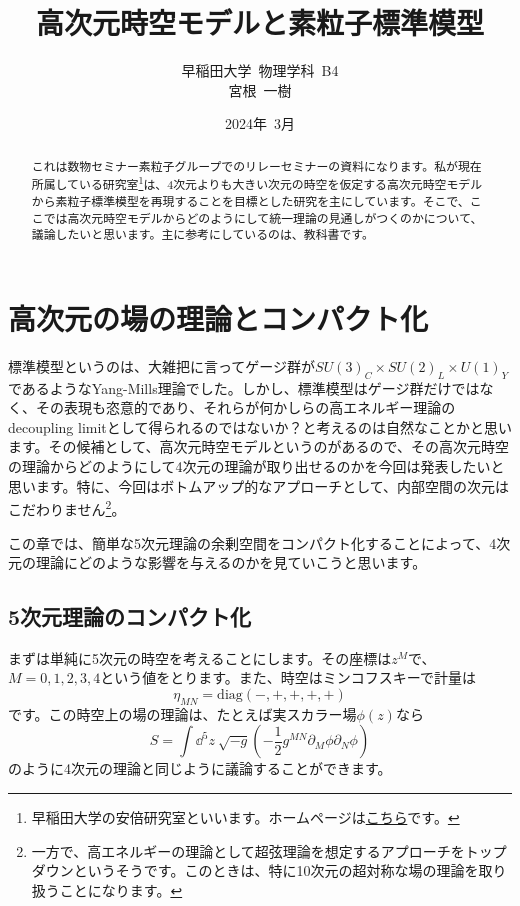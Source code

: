 \documentclass[unicode,a4paper,11pt]{ltjsarticle}
\title{高次元時空モデルと素粒子標準模型}
\author{
   早稲田大学\ 物理学科\ B4
   \\
   宮根\ 一樹
}
\date{2024年\ 3月}
\begin{document}
\maketitle

\begin{abstract}
   これは数物セミナー素粒子グループでのリレーセミナーの資料になります。私が現在所属している研究室\footnote{
      早稲田大学の安倍研究室といいます。ホームページは\href{http://www.hep.phys.waseda.ac.jp/index-j.html}{こちら}です。
   }は、4次元よりも大きい次元の時空を仮定する高次元時空モデルから素粒子標準模型を再現することを目標とした研究を主にしています。そこで、ここでは高次元時空モデルからどのようにして統一理論の見通しがつくのかについて、議論したいと思います。主に参考にしているのは、教科書\cite{Fujii:2005}です。
\end{abstract}

\tableofcontents

\clearpage

\section{高次元の場の理論とコンパクト化}

標準模型というのは、大雑把に言ってゲージ群が$SU(3)_{C}\times SU(2)_{L}\times U(1)_{Y}$であるようなYang-Mills理論でした。しかし、標準模型はゲージ群だけではなく、その表現も恣意的であり、それらが何かしらの高エネルギー理論のdecoupling limitとして得られるのではないか？と考えるのは自然なことかと思います。その候補として、高次元時空モデルというのがあるので、その高次元時空の理論からどのようにして4次元の理論が取り出せるのかを今回は発表したいと思います。特に、今回はボトムアップ的なアプローチとして、内部空間の次元はこだわりません\footnote{
   一方で、高エネルギーの理論として超弦理論を想定するアプローチをトップダウンというそうです。このときは、特に10次元の超対称な場の理論を取り扱うことになります。
}。

この章では、簡単な5次元理論の余剰空間をコンパクト化することによって、4次元の理論にどのような影響を与えるのかを見ていこうと思います。


\subsection{5次元理論のコンパクト化}

まずは単純に5次元の時空を考えることにします。その座標は$z^{M}$で、$M=0,1,2,3,4$という値をとります。また、時空はミンコフスキーで計量は
\begin{equation}
   \eta_{MN}
   =
   \mathrm{diag}(-,+,+,+,+)
\end{equation}
です。この時空上の場の理論は、たとえば実スカラー場$\phi(z)$なら
\begin{equation}
   S
   =
   \int\dd^5 z\ \sqrt{-g}
   \left(
   -\frac{1}{2}
   g^{MN}\partial_{M}\phi\partial_{N}\phi
   \right)
   \label{eqn:action_5d_real_scalar}
\end{equation}
のように4次元の理論と同じように議論することができます。
\end{document}
